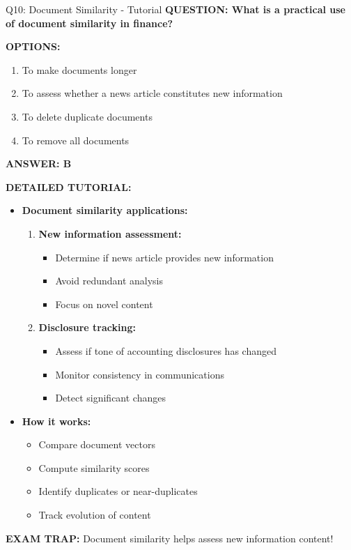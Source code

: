 \documentclass[8pt]{beamer}
\begin{document}
	\begin{frame}{Q10: Document Similarity - Tutorial}
		\fontsize{6.5}{7.5}\selectfont
		\textbf{QUESTION: What is a practical use of document similarity in finance?}
		
		\vspace{0.1cm}
		\textbf{OPTIONS:}
		\begin{enumerate}
			\item To make documents longer
			\item To assess whether a news article constitutes new information
			\item To delete duplicate documents
			\item To remove all documents
		\end{enumerate}
		
		\vspace{0.1cm}
		\textcolor{myblue}{\textbf{ANSWER: B}}
		
		\vspace{0.1cm}
		\textbf{DETAILED TUTORIAL:}
		\begin{itemize}
			\item \textbf{Document similarity applications:}
			\begin{enumerate}
				\item \textbf{New information assessment:}
				\begin{itemize}
					\item Determine if news article provides new information
					\item Avoid redundant analysis
					\item Focus on novel content
				\end{itemize}
				\item \textbf{Disclosure tracking:}
				\begin{itemize}
					\item Assess if tone of accounting disclosures has changed
					\item Monitor consistency in communications
					\item Detect significant changes
				\end{itemize}
			\end{enumerate}
			\item \textbf{How it works:}
			\begin{itemize}
				\item Compare document vectors
				\item Compute similarity scores
				\item Identify duplicates or near-duplicates
				\item Track evolution of content
			\end{itemize}
		\end{itemize}
		
		\textcolor{myred}{\textbf{EXAM TRAP:}} Document similarity helps assess \textcolor{myblue}{new information content}!
	\end{frame}
	
\end{document}
